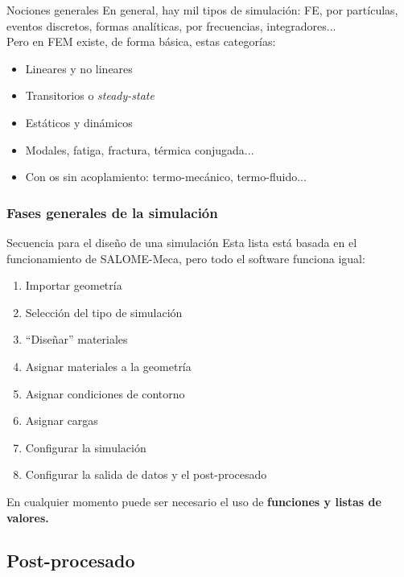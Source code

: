 \documentclass[12pt]{beamer}
\begin{document}
\begin{frame}{Nociones generales}
	En general, hay mil tipos de simulación: FE, por partículas, eventos discretos, formas analíticas, por frecuencias, integradores... \\
	Pero en FEM existe, de forma básica, estas categorías:
	\begin{itemize}
		\item Lineares y no lineares
		\item Transitorios o \textit{steady-state}
		\item Estáticos y dinámicos
		\item Modales, fatiga, fractura, térmica conjugada...
		\item Con os sin acoplamiento: termo-mecánico, termo-fluido...
	\end{itemize}
\end{frame}

\subsubsection{Fases generales de la simulación}

\begin{frame}{Secuencia para el diseño de una simulación}
	Esta lista está basada en el funcionamiento de SALOME-Meca, pero todo el software funciona igual:
	\begin{enumerate}
		\item Importar geometría
		\item Selección del tipo de simulación
		\item ``Diseñar'' materiales
		\item Asignar materiales a la geometría
		\item Asignar condiciones de contorno
		\item Asignar cargas
		\item Configurar la simulación
		\item Configurar la salida de datos y el post-procesado
	\end{enumerate}
	En cualquier momento puede ser necesario el uso de \textbf{funciones y listas de valores.} 
\end{frame}

\subsection{Post-procesado}
\end{document}
